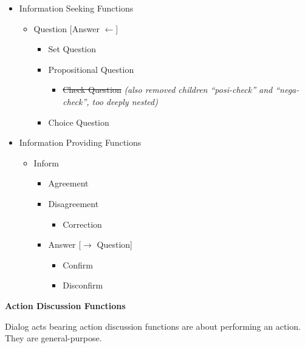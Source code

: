 \begin{itemize}
	\item Information Seeking Functions
		\begin{itemize}
			\item Question [Answer $\leftarrow$]
				\begin{itemize}
					\item Set Question
					\item Propositional Question
						\begin{itemize}
							\item \sout{Check Question} \textit{(also removed children ``posi-check'' and ``nega-check'', too deeply nested)}
						\end{itemize}
					\item Choice Question
				\end{itemize}
		\end{itemize}
	\item Information Providing Functions
		\begin{itemize}
			\item Inform
				\begin{itemize}
					\item Agreement
					\item Disagreement
						\begin{itemize}
							\item Correction
						\end{itemize}
					\item Answer [$\rightarrow$ Question]
						\begin{itemize}
							\item Confirm
							\item Disconfirm
						\end{itemize}
				\end{itemize}
		\end{itemize}
\end{itemize}

\textbf{Action Discussion Functions}
\vspace{0.1cm}

Dialog acts bearing action discussion functions are about performing an action. They are general-purpose.

